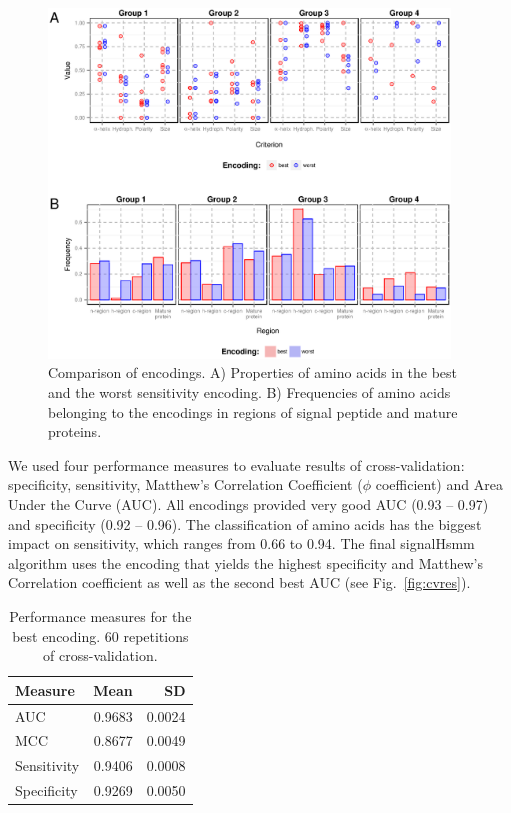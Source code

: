 \documentclass[fleqn,10pt,twoside]{gcb15submission}
\begin{document}
\begin{figure}[ht]\centering
\includegraphics[width=0.95\textwidth]{figures/enccomp.eps}
\caption{Comparison of encodings. A) Properties of amino acids in the best and the worst sensitivity encoding. B) Frequencies of amino acids belonging to the encodings in regions of signal peptide and mature proteins.}
\label{fig:enccomp}
\end{figure}

We used four performance measures to evaluate results of cross-validation: specificity, sensitivity, Matthew's Correlation Coefficient ($\phi$ coefficient) and Area Under the Curve (AUC). All encodings provided very good AUC (0.93 -- 0.97) and specificity (0.92 -- 0.96). The classification of amino acids has the biggest impact on sensitivity, which ranges from 0.66 to 0.94. The final signalHsmm algorithm uses the encoding that yields the highest specificity and Matthew's Correlation coefficient as well as the second best AUC (see Fig.~\ref{fig:cvres}).

\begin{table}[ht]
\small
\centering
\caption{Performance measures for the best encoding. 60 repetitions of cross-validation.} 
\begin{tabular}{lrr}
  \toprule
Measure & Mean & SD \\ 
  \midrule
AUC & 0.9683 & 0.0024 \\ 
   \rowcolor[gray]{0.85}MCC & 0.8677 & 0.0049 \\ 
  Sensitivity & 0.9406 & 0.0008 \\ 
   \rowcolor[gray]{0.85}Specificity & 0.9269 & 0.0050 \\ 
   \bottomrule
\end{tabular}
\label{tab:perfmeas}
\end{table}
\end{document}
